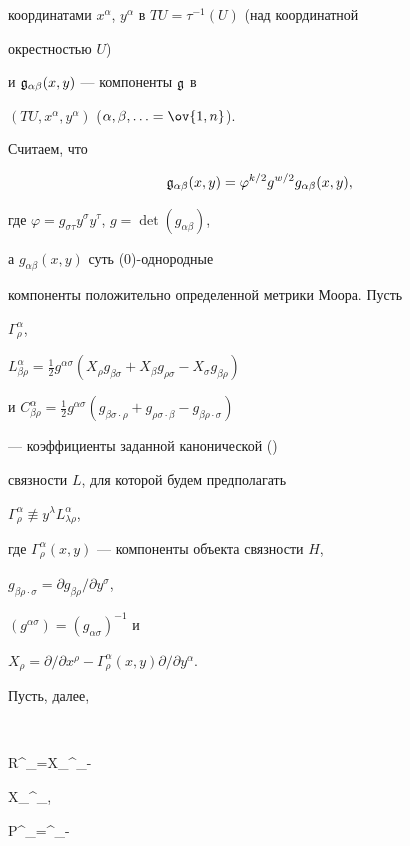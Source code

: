 координатами $x^\alpha$, $y^\alpha$ в $TU=\tau^{-1}(U)$ (над координатной 


окрестностью $U$) 


и $\frak g_{\alpha\beta}(x,y)$ --- компоненты $\frak g$ в 


$(TU,x^\alpha,y^\alpha)$ ($\alpha,\beta,\dotsc=\ov{1,n}$). 


Считаем, что 


$$ 


\frak g_{\alpha\beta}(x,y)=\varphi^{k/2}g^{w/2} 


g_{\alpha\beta}(x,y), 


$$ 


где $\varphi=g_{\sigma\tau}y^\sigma y^\tau$, $g=\det(g_{\alpha\beta})$, 


а $g_{\alpha\beta}(x,y)$ суть (0)-однородные  


компоненты положительно определенной метрики Моора. Пусть 


$\Gamma^\alpha_\rho$, 


$L^\alpha_{\beta\rho}=\frac{1}{2}g^{\alpha\sigma}(X_\rho 


g_{\beta\sigma}+X_\beta g_{\rho\sigma}-X_\sigma g_{\beta\rho})$ 


и $C^\alpha_{\beta\rho}=\frac{1}{2}g^{\alpha\sigma} 


(g_{\beta\sigma\cdot\rho}+g_{\rho\sigma\cdot\beta}- 


g_{\beta\rho\cdot\sigma})$ 


--- коэффициенты заданной канонической (\cite{6})  


связности $L$, для которой будем предполагать 


$\Gamma^\alpha_\rho\not\equiv y^\lambda L^\alpha_{\lambda\rho}$, 


где $\Gamma^\alpha_\rho(x,y)$ --- компоненты объекта связности $H$, 


$g_{\beta\rho\cdot\sigma}=\partial g_{\beta\rho}/\partial y^\sigma$, 


$(g^{\alpha\sigma})=(g_{\alpha\sigma})^{-1}$ и 


$X_\rho=\partial/\partial 


x^\rho-\Gamma^\alpha_\rho(x,y)\partial/\partial y^\alpha$. 


Пусть, далее, 


$$ 


R^\alpha_{\beta\rho}=X_\rho\Gamma^\alpha_\beta- 


X_\beta\Gamma^\alpha_\rho,\quad 


P^\alpha_{\beta\rho}=\Gamma^\alpha_{\beta\cdot\rho}- 



